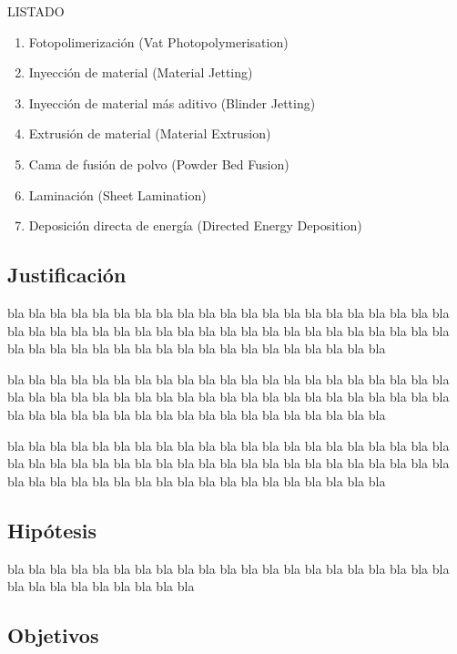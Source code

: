 \documentclass[12pt]{article}
\begin{document}
LISTADO

\begin{enumerate}
    \item Fotopolimerizaci\'on  (Vat Photopolymerisation)
    \item Inyecci\'on de material  (Material Jetting)
    \item Inyecci\'on de material m\'as aditivo (Blinder Jetting)
    \item Extrusi\'on de material (Material Extrusion)
    \item Cama de fusi\'on de polvo (Powder Bed Fusion)
    \item Laminaci\'on (Sheet Lamination)
    \item Deposici\'on  directa de energ\'ia (Directed Energy Deposition)
\end{enumerate}



\subsection{Justificación}

\vspace*{0.3cm}
bla bla bla bla bla bla bla bla bla bla bla bla bla bla bla bla bla bla bla bla bla bla bla bla bla bla bla bla bla bla bla bla bla bla bla bla bla bla bla bla bla bla bla bla bla bla bla bla bla bla bla bla bla bla bla bla bla bla bla bla
 

\vspace*{0.3cm}
bla bla bla bla bla bla bla bla bla bla bla bla bla bla bla bla bla bla bla bla bla bla bla bla bla bla bla bla bla bla bla bla bla bla bla bla bla bla bla bla bla bla bla bla bla bla bla bla bla bla bla bla bla bla bla bla bla bla bla bla

bla bla bla bla bla bla bla bla bla bla bla bla bla bla bla bla bla bla bla bla bla bla bla bla bla bla bla bla bla bla bla bla bla bla bla bla bla bla bla bla bla bla bla bla bla bla bla bla bla bla bla bla bla bla bla bla bla bla bla bla

\subsection{Hipótesis}
bla bla bla bla bla bla bla bla bla bla bla bla bla bla bla bla bla bla bla bla bla bla bla bla bla bla bla bla bla bla

\subsection{Objetivos}
\end{document}

